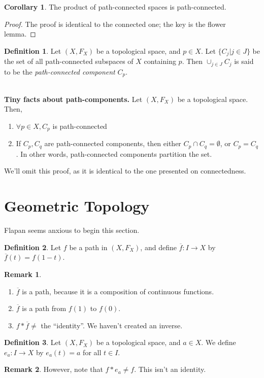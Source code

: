 \documentclass{article}
\theoremstyle{definition}
\newtheorem*{Definition}{Definition}
\newtheorem*{Remark}{Remark}
\newtheorem*{Cor}{Corollary}
\begin{document}
\begin{Cor} 
The product of path-connected spaces is path-connected.
\end{Cor}
\begin{proof}
The proof is identical to the connected one; the key is the flower lemma.
\end{proof}
\begin{Definition}
Let $(X,F_X)$ be a topological space, and $p\in X$. Let $\{C_j | j\in J\}$ be the set of all path-connected subspaces of $X$ containing $p$. Then $\cup_{j\in J} C_j$ is said to be the \textit{path-connected component} $C_p$. 
\end{Definition}
\vspace{-.2in} \text{}\\
\textbf{Tiny facts about path-components.} Let $(X,F_X)$ be a topological space. Then,
\begin{enumerate}
	\item $\forall p\in X, C_p$ is path-connected
	\item If $C_p, C_q$ are path-connected components, then either $C_p \cap C_q = \emptyset$, or $C_p = C_q$. In other words, path-connected components partition the set. 
\end{enumerate}
We'll omit this proof, as it is identical to the one presented on connectedness.
\section{Geometric Topology}
Flapan seems anxious to begin this section. 
\begin{Definition}
Let $f$ be a path in $(X,F_X)$, and define $\overline{f} : I \to X$ by $\overline{f} (t) = f(1-t)$. 
\end{Definition}
\begin{Remark}
\text{}
\begin{enumerate}
	\item $\overline{f}$ is a path, because it is a composition of continuous functions.
	\item $\overline{f}$ is a path from $f(1)$ to $f(0)$.
	\item $f \ast \overline{f} \neq $ the ``identity''. We haven't created an inverse. 
\end{enumerate}
\end{Remark}
\begin{Definition}
Let $(X,F_X)$ be a topological space, and $a\in X$. We define $e_a: I\to X$ by $e_a (t) = a$ for all $t\in I$.
\end{Definition}
\begin{Remark}
However, note that  $f\ast e_a \neq f$. This isn't  an identity.
\end{Remark}
\end{document}
